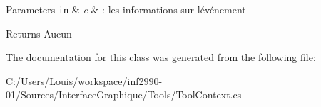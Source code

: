 \begin{DoxyParams}[1]{Parameters}
\mbox{\tt in}  & {\em e} & \+: les informations sur l\textquotesingle{}événement\\
\hline
\end{DoxyParams}
\begin{DoxyReturn}{Returns}
Aucun 
\end{DoxyReturn}


The documentation for this class was generated from the following file\+:\begin{DoxyCompactItemize}
\item 
C\+:/\+Users/\+Louis/workspace/inf2990-\/01/\+Sources/\+Interface\+Graphique/\+Tools/Tool\+Context.\+cs\end{DoxyCompactItemize}
